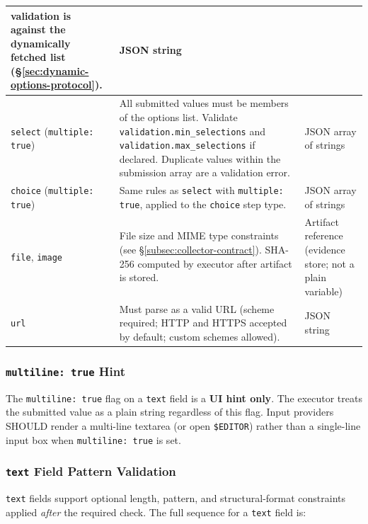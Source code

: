 \begin{center}
\begin{tabular}{|l|p{5.0cm}|p{3.6cm}|}
    validation is against the dynamically fetched list (§\ref{sec:dynamic-options-protocol}).
  & JSON string \\
\hline
\texttt{select}
(\texttt{multiple: true})
  & All submitted values must be members of the options list.
    Validate \texttt{validation.min\_selections} and
    \texttt{validation.max\_selections} if declared.
    Duplicate values within the submission array are a validation error.
  & JSON array of strings \\
\hline
\texttt{choice}
(\texttt{multiple: true})
  & Same rules as \texttt{select} with \texttt{multiple: true}, applied to the
    \texttt{choice} step type.
  & JSON array of strings \\
\hline
\texttt{file},
\texttt{image}
  & File size and MIME type constraints (see §\ref{subsec:collector-contract}).
    SHA-256 computed by executor after artifact is stored.
  & Artifact reference (evidence store; not a plain variable) \\
\hline
\texttt{url}
  & Must parse as a valid URL (scheme required; HTTP and HTTPS accepted by
    default; custom schemes allowed).
  & JSON string \\
\hline
\end{tabular}
\end{center}

\subsubsection*{\texttt{multiline: true} Hint}

The \texttt{multiline: true} flag on a \texttt{text} field is a \textbf{UI hint only}.
The executor treats the submitted value as a plain string regardless of this flag.
Input providers SHOULD render a multi-line textarea (or open \texttt{\$EDITOR}) rather
than a single-line input box when \texttt{multiline: true} is set.

\subsubsection*{\texttt{text} Field Pattern Validation}

\texttt{text} fields support optional length, pattern, and structural-format
constraints applied \emph{after} the required check.  The full sequence for a
\texttt{text} field is:

